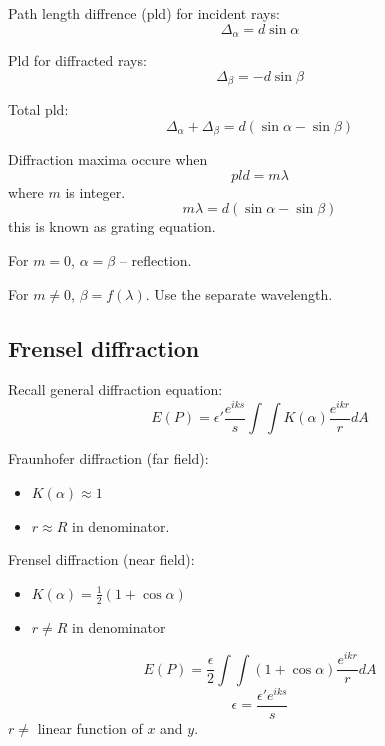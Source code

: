\documentclass[10pt]{article}
\begin{document}
Path length diffrence (pld) for incident rays:
\begin{equation*}
\Delta_\alpha = d \sin{\alpha}
\end{equation*}

Pld for diffracted rays:
\begin{equation*}
\Delta_\beta = - d \sin{\beta}
\end{equation*}

Total pld:
\begin{equation*}
\Delta_\alpha  + \Delta_\beta = d (\sin{\alpha} - \sin{\beta})
\end{equation*}

Diffraction maxima occure when
\begin{equation*}
pld = m \lambda
\end{equation*}
where $m$ is integer.
\begin{equation}\boxed{
m \lambda = d (\sin{\alpha} - \sin{\beta})
}\end{equation}
this is known as grating equation.

For $m = 0$, $\alpha = \beta$ -- reflection.

For $m \neq 0$, $\beta = f(\lambda)$. Use the separate wavelength.

\subsection{Frensel diffraction}
Recall general diffraction equation:
\begin{equation}\boxed{
E(P) = \epsilon' \frac{e^{iks}}{s}\int \int K(\alpha) \frac{e^{ikr}}{r}dA
}\end{equation}

Fraunhofer diffraction (far field):
\begin{itemize}
\item[(i)] $K(\alpha) \approx 1$
\item[(ii)] $r \approx R$ in denominator.
\end{itemize}

Frensel diffraction (near field):
\begin{itemize}
\item[(i)] $K(\alpha) = \frac{1}{2}(1 + \cos{\alpha})$
\item[(ii)] $r \neq R$ in denominator
\end{itemize}
\begin{equation}\boxed{
E(P) = \frac{\epsilon}{2} \int \int (1 + \cos{\alpha}) \frac{e^{ikr}}{r}dA
}\end{equation}
\begin{equation*}
\epsilon = \frac{\epsilon' e^{iks}}{s}
\end{equation*}
$r \neq$ linear function of $x$ and $y$.
\end{document}
